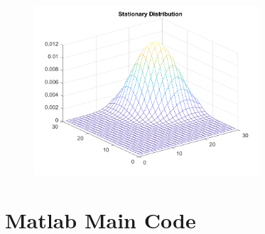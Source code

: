 \documentclass[11pt,letter]{article}
\begin{document}
\begin{figure}[h]
\begin{center}
\includegraphics[width=0.75\textwidth]{stationary.png}
\end{center}
\end{figure}

\newpage
\section*{Matlab Main Code}

\end{document}
